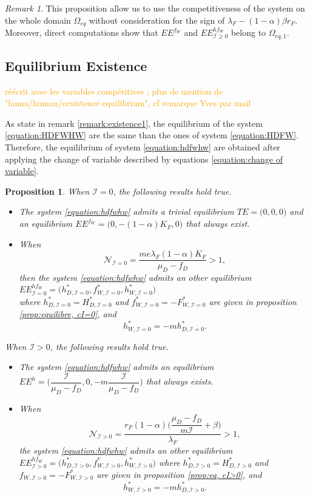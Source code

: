 \documentclass{article}
\newcommand{\lfw}{\lambda_{F}}
\newcommand{\lfw}{\lambda_{F}}
\newcommand{\cI}{\mathcal{I}}
\newcommand{\vdeux}[1]{\textcolor{orange}{#1}}
\newtheorem{prop}[theorem]{Proposition}
\theoremstyle{definition}
\theoremstyle{remark}
\newtheorem{remark}[theorem]{Remark}
\begin{document}
\begin{remark} \label{remark:competitivity}
This proposition allow us to use the competitiveness of the system on the whole domain $\Omega_{eq}$ without consideration for the sign of $\lfw - (1-\alpha)\beta r_F$. Moreover, direct computations show that $EE^{f_W}$ and $EE^{hf_W}_{\cI \geq 0}$ belong to $\Omega_{eq, 1}$.
\end{remark}

\subsection{Equilibrium Existence}
\vdeux{réécrit avec les variables compétitives ; plus de mention de "fauna/human/cexistence equilibrium", cf remarque Yves par mail}

As state in remark \ref{remark:existence1}, the equilibrium of the system \eqref{equation:HDFWHW} are the same than the ones of system \eqref{equation:HDFW}. Therefore, the equilibrium of system \eqref{equation:hdfwhw} are obtained after applying the change of variable described by equations \eqref{equation:change of variable}.

\begin{prop}
When $\cI = 0$, the following results hold true.
\begin{itemize}
\item The system \eqref{equation:hdfwhw} admits a trivial equilibrium $TE = \Big(0,0, 0\Big)$ and an equilibrium $EE^{f_W} = \Big(0, -(1-\alpha)K_F,0 \Big)$ that always exist.

\item When
$$
\mathcal{N}_{\cI = 0} = \dfrac{m e \lfw (1-\alpha)K_F}{\mu_D - f_D} > 1,
$$ 
then the system \eqref{equation:hdfwhw} admits an other equilibrium $EE^{hf_W}_{\cI = 0} = \Big(h^*_{D, \cI = 0}, f^*_{W, \cI = 0}, h^*_{W, \cI = 0}\Big)$ \\ 
where $h^*_{D, \cI = 0} = H^*_{D, \cI = 0}$ and $f^*_{W, \cI = 0} = -F^*_{W, \cI = 0}$ are given in proposition \ref{prop:equilibre, cI=0}, and
$$ 
h^*_{W, \cI = 0} = -m h^*_{D, \cI = 0}.
$$
\end{itemize}

When $\cI > 0$, the following results hold true.
\begin{itemize}
\item The system \eqref{equation:hdfwhw} admits an equilibrium $EE^{h} = \Big(\dfrac{\cI}{\mu_D - f_D}, 0, -m\dfrac{\cI}{\mu_D - f_D} \Big)$ that always exists.
\item When 
$$ \mathcal{N}_{\cI >0} =\dfrac{r_F(1-\alpha)\Big({\dfrac{\mu_D - f_D}{m\cI}+\beta\Big)}}{\lfw}  > 1,$$
the system \eqref{equation:hdfwhw} admits an other equilibrium $EE^{hf_W}_{\cI > 0} = \Big(h^*_{D, \cI > 0}, f^*_{W, \cI > 0}, h^*_{W, \cI > 0}\Big)$
where $h^*_{D, \cI > 0} = H^*_{D, \cI > 0}$ and $f_{W, \cI > 0} = - F^*_{W, \cI > 0}$ are given in proposition \ref{prop:eq, cI>0}, and
$$ 
h^*_{W, \cI > 0} = -m h^*_{D, \cI > 0}.
$$
\end{itemize} 
\end{prop}  
\end{document}
